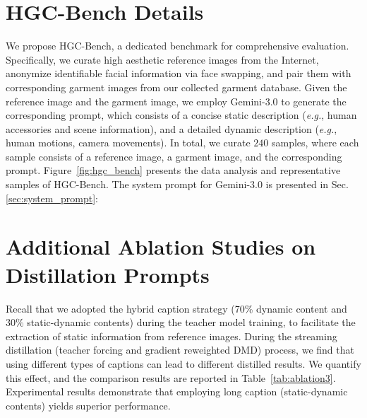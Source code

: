 \documentclass{llmxive}
\begin{document}
\section{HGC-Bench Details}
%
We propose HGC-Bench, a dedicated benchmark for comprehensive evaluation. Specifically, we curate high aesthetic reference images from the Internet, anonymize identifiable facial information via face swapping, and pair them with corresponding garment images from our collected garment database.
Given the reference image and the garment image, we employ Gemini-3.0 to generate the corresponding prompt, which consists of a concise static description (\emph{e.g.}, human accessories and scene information), and a detailed dynamic description (\emph{e.g.}, human motions, camera movements).
In total, we curate $240$ samples, where each sample consists of a reference image, a garment image, and the corresponding prompt.
%
Figure~\ref{fig:hgc_bench} presents the data analysis and representative samples of HGC-Bench.
% 
The system prompt for Gemini-3.0 is presented in Sec.\,\ref{sec:system_prompt}:





\section{Additional Ablation Studies on Distillation Prompts}
\label{sec:ablation4}
% 
Recall that we adopted the hybrid caption strategy (70\% dynamic content and 30\% static-dynamic contents) during the teacher model training, to facilitate the extraction of static information from reference images.
% 
During the streaming distillation (teacher forcing and gradient reweighted DMD) process, we find that using different types of captions can lead to different distilled results.
We quantify this effect, and the comparison results are reported in Table~\ref{tab:ablation3}.
% 
Experimental results demonstrate that employing long caption (static-dynamic contents) yields superior performance.
\end{document}
